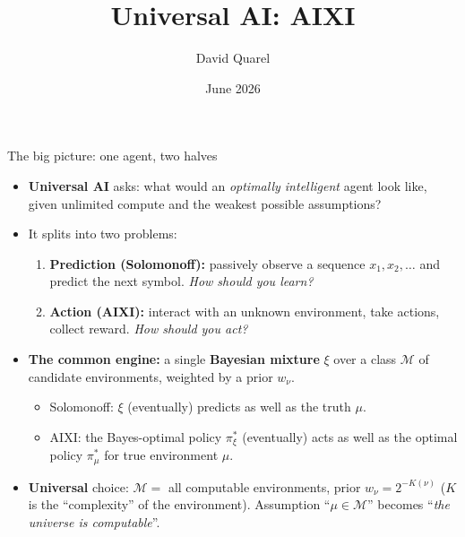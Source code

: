 \documentclass[10pt,aspectratio=169]{beamer}
\newcommand{\cM}{\mathcal{M}}
\begin{document}
\title[AIXI: a speedrun]{Universal AI: AIXI}
\author[David Quarel]{David Quarel}
\date{June 2026}

\frame{\titlepage}

\begin{frame}{The big picture: one agent, two halves}
\begin{itemize}
    \item \textbf{Universal AI} asks: what would an \emph{optimally intelligent} agent look like, given unlimited compute and the weakest possible assumptions?
    \pause
    \item It splits into two problems:
    \begin{enumerate}
        \item \textbf{Prediction (Solomonoff):} passively observe a sequence $x_1, x_2, \ldots$ and predict the next symbol. \emph{How should you learn?}
        \pause
        \item \textbf{Action (AIXI):} interact with an unknown environment, take actions, collect reward. \emph{How should you act?}
    \end{enumerate}
    \pause
    \item \textbf{The common engine:} a single \textbf{Bayesian mixture} $\xi$ over a class $\cM$ of candidate environments, weighted by a prior $w_\nu$.
    \begin{itemize}
        \item Solomonoff: $\xi$ (eventually) predicts as well as the truth $\mu$.
        \item AIXI: the Bayes-optimal policy $\pi_\xi^*$ (eventually) acts as well as the optimal policy $\pi_\mu^*$ for true environment $\mu$.
    \end{itemize}
    \pause
    \item \textbf{Universal} choice: $\cM=$ all computable environments, prior $w_\nu = 2^{-K(\nu)}$ ($K$ is the ``complexity'' of the environment). Assumption ``$\mu\in\cM$'' becomes ``\emph{the universe is computable}''.
\end{itemize}
\end{frame}
\end{document}
